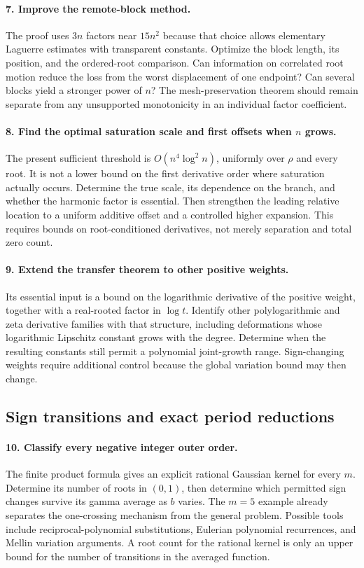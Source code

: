 \paragraph{7. Improve the remote-block method.}
The proof uses $3n$ factors near $15n^2$ because that choice allows
elementary Laguerre estimates with transparent constants. Optimize
the block length, its position, and the ordered-root comparison.
Can information on correlated root motion reduce the loss from
the worst displacement of one endpoint? Can several blocks yield
a stronger power of $n$? The mesh-preservation theorem should
remain separate from any unsupported monotonicity in an individual
factor coefficient.

\paragraph{8. Find the optimal saturation scale and first offsets
when $n$ grows.}
The present sufficient threshold is $O(n^4\log^2 n)$, uniformly
over $\rho$ and every root. It is not a lower bound on the first
derivative order where saturation actually occurs. Determine the
true scale, its dependence on the branch, and whether the harmonic
factor is essential. Then strengthen the leading relative location
to a uniform additive offset and a controlled higher expansion.
This requires bounds on root-conditioned derivatives, not merely
separation and total zero count.

\paragraph{9. Extend the transfer theorem to other positive weights.}
Its essential input is a bound on the logarithmic derivative of the
positive weight, together with a real-rooted factor in $\log t$.
Identify other polylogarithmic and zeta derivative families with
that structure, including deformations whose logarithmic Lipschitz
constant grows with the degree. Determine when the resulting
constants still permit a polynomial joint-growth range.
Sign-changing weights require additional control because the
global variation bound may then change.

\subsection{Sign transitions and exact period reductions}

\paragraph{10. Classify every negative integer outer order.}
The finite product formula gives an explicit rational Gaussian
kernel for every $m$. Determine its number of roots in $(0,1)$,
then determine which permitted sign changes survive its gamma
average as $b$ varies. The $m=5$ example already separates the
one-crossing mechanism from the general problem.
Possible tools include reciprocal-polynomial substitutions,
Eulerian polynomial recurrences, and Mellin variation arguments.
A root count for the rational kernel is only an upper bound for
the number of transitions in the averaged function.

